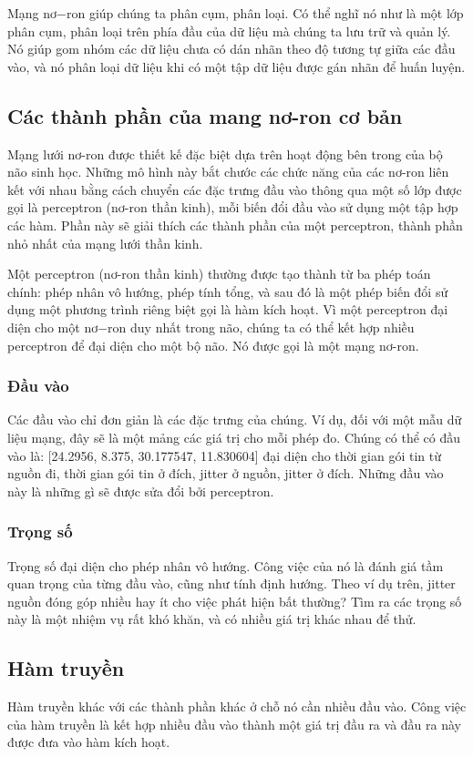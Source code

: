 Mạng nơ$-$ron giúp chúng ta phân cụm, phân loại. Có thể nghĩ nó như là một lớp phân cụm, phân loại trên phía đầu của dữ liệu mà chúng ta lưu trữ và quản lý. Nó giúp gom nhóm các dữ liệu chưa có dán nhãn theo độ tương tự giữa các đầu vào, và nó phân loại dữ liệu khi có một tập dữ liệu được gán nhãn để huấn luyện.

\subsection{Các thành phần của mang nơ-ron cơ bản}
Mạng lưới nơ-ron được thiết kế đặc biệt dựa trên hoạt động bên trong của bộ não sinh học. Những mô hình này bắt chước các chức năng của các nơ-ron liên kết với nhau bằng cách chuyển các đặc trưng đầu vào thông qua một số lớp được gọi là perceptron (nơ-ron thần kinh), mỗi biến đổi đầu vào sử dụng một tập hợp các hàm. Phần này sẽ giải thích các thành phần của một perceptron, thành phần nhỏ nhất của mạng lưới thần kinh.

Một perceptron (nơ-ron thần kinh) thường được tạo thành từ ba phép toán chính: phép nhân vô hướng, phép tính tổng, và sau đó là một phép biến đổi sử dụng một phương trình riêng biệt gọi là hàm kích hoạt. Vì một perceptron đại diện cho một nơ$-$ron duy nhất trong não, chúng ta có thể kết hợp nhiều perceptron để đại diện cho một bộ não. Nó được gọi là một mạng nơ-ron.

\subsubsection{Đầu vào}
Các đầu vào chỉ đơn giản là các đặc trưng của chúng. Ví dụ, đối với một mẫu dữ liệu mạng, đây sẽ là một mảng các giá trị cho mỗi phép đo. Chúng có thể có đầu vào là: [24.2956, 8.375, 30.177547, 11.830604] đại diện cho thời gian gói tin từ nguồn đi, thời gian gói tin ở đích, jitter ở nguồn, jitter ở đích. Những đầu vào này là những gì sẽ được sửa đổi bởi perceptron.

\subsubsection{Trọng số}
Trọng số đại diện cho phép nhân vô hướng. Công việc của nó là đánh giá tầm quan trọng của từng đầu vào, cũng như tính định hướng. Theo ví dụ trên, jitter nguồn đóng góp nhiều hay ít cho việc phát hiện bất thường? Tìm ra các trọng số này là một nhiệm vụ rất khó khăn, và có nhiều giá trị khác nhau để thử.

\subsection{Hàm truyền}
Hàm truyền khác với các thành phần khác ở chỗ nó cần nhiều đầu vào. Công việc của hàm truyền là kết hợp nhiều đầu vào thành một giá trị đầu ra và đầu ra này được đưa vào hàm kích hoạt.

